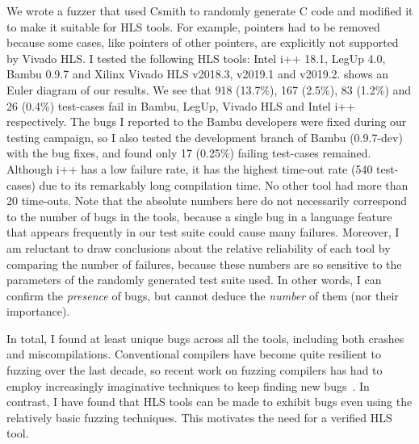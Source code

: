We wrote a fuzzer that used Csmith to randomly generate C code and modified it
to make it suitable for HLS tools.  For example, pointers had to be removed
because some cases, like pointers of other pointers, are explicitly not
supported by Vivado HLS.  I tested the following \gls{HLS} tools: Intel i++
18.1, LegUp 4.0, Bambu 0.9.7 and Xilinx Vivado HLS v2018.3, v2019.1 and v2019.2.
 shows an Euler diagram of our results.  We see that
918 (13.7\%), 167 (2.5\%), 83 (1.2\%) and 26 (0.4\%) test-cases fail in Bambu,
LegUp, Vivado HLS and Intel i++ respectively.  The bugs I reported to the Bambu
developers were fixed during our testing campaign, so I also tested the
development branch of Bambu (0.9.7-dev) with the bug fixes, and found only 17
(0.25\%) failing test-cases remained.  Although i++ has a low failure rate, it
has the highest time-out rate (540 test-cases) due to its remarkably long
compilation time. No other tool had more than 20 time-outs.  Note that the
absolute numbers here do not necessarily correspond to the number of bugs in the
tools, because a single bug in a language feature that appears frequently in our
test suite could cause many failures.  Moreover, I am reluctant to draw
conclusions about the relative reliability of each tool by comparing the number
of failures, because these numbers are so sensitive to the parameters of the
randomly generated test suite used. In other words, I can confirm the
\emph{presence} of bugs, but cannot deduce the \emph{number} of them (nor their
importance).

In total, I found at least \numuniquebugs{} unique bugs across all the tools,
including both crashes and miscompilations.  Conventional compilers have become
quite resilient to fuzzing over the last decade, so recent work on fuzzing
compilers has had to employ increasingly imaginative techniques to keep finding
new bugs~\cite{even-mendoza20_ce}.  In contrast, I have found that HLS tools can
be made to exhibit bugs even using the relatively basic fuzzing techniques.
This motivates the need for a verified \gls{HLS} tool.

